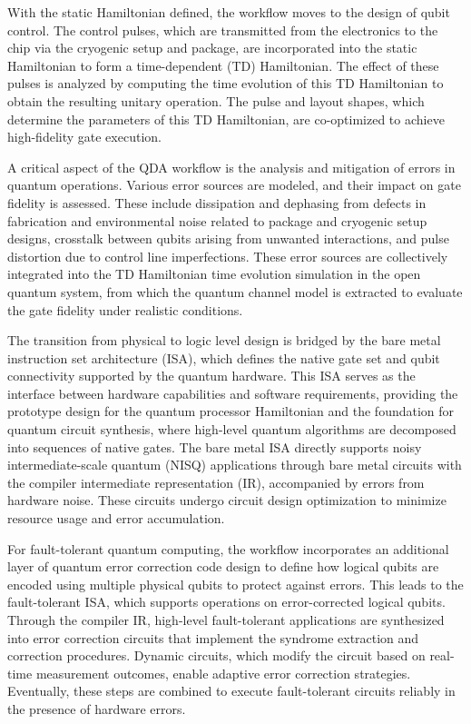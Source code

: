 \documentclass[a4paper,onecolumn,11pt,unpublished]{quantumarticle}
\begin{document}
With the static Hamiltonian defined, the workflow moves to the design of qubit control. The control pulses, which are transmitted from the electronics to the chip via the cryogenic setup and package, are incorporated into the static Hamiltonian to form a time-dependent (TD) Hamiltonian. The effect of these pulses is analyzed by computing the time evolution of this TD Hamiltonian to obtain the resulting unitary operation. 
The pulse and layout shapes, which determine the parameters of this TD Hamiltonian, are co-optimized to achieve high-fidelity gate execution.

A critical aspect of the QDA workflow is the analysis and mitigation of errors in quantum operations. Various error sources are modeled, and their impact on gate fidelity is assessed. These include dissipation and dephasing from defects in fabrication and environmental noise related to package and cryogenic setup designs, crosstalk between qubits arising from unwanted interactions, and pulse distortion due to control line imperfections. These error sources are collectively integrated into the TD Hamiltonian time evolution simulation in the open quantum system, from which the quantum channel model is extracted to evaluate the gate fidelity under realistic conditions.

The transition from physical to logic level design is bridged by the bare metal instruction set architecture (ISA), which defines the native gate set and qubit connectivity supported by the quantum hardware. This ISA serves as the interface between hardware capabilities and software requirements, providing the prototype design for the quantum processor Hamiltonian and the foundation for quantum circuit synthesis, where high-level quantum algorithms are decomposed into sequences of native gates. The bare metal ISA directly supports noisy intermediate-scale quantum (NISQ) applications through bare metal circuits with the compiler intermediate representation (IR), accompanied by errors from hardware noise. These circuits undergo circuit design optimization to minimize resource usage and error accumulation.

For fault-tolerant quantum computing, the workflow incorporates an additional layer of quantum error correction code design to define how logical qubits are encoded using multiple physical qubits to protect against errors. This leads to the fault-tolerant ISA, which supports operations on error-corrected logical qubits. Through the compiler IR, high-level fault-tolerant applications are synthesized into error correction circuits that implement the syndrome extraction and correction procedures. Dynamic circuits, which modify the circuit based on real-time measurement outcomes, enable adaptive error correction strategies. Eventually, these steps are combined to execute fault-tolerant circuits reliably in the presence of hardware errors.
\end{document}
